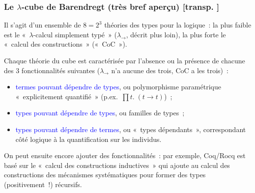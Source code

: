 \documentclass[mathserif,a4paper,aspectratio=169]{beamer}
\renewcommand{\frametitle}[1]{\subsubsection*{#1 {\footnotesize[transp. \insertframenumber]}}}
\begin{document}
\begin{frame}
\frametitle{Le $\lambda$-cube de Barendregt (très bref aperçu)}

Il s'agit d'un ensemble de $8 = 2^3$ théories des types pour la
logique : la plus faible est le « $\lambda$-calcul simplement typé »
($\lambda_\rightarrow$, décrit plus loin), la plus forte le « calcul
des constructions » (« CoC »).

\medskip

Chaque théorie du cube est caractérisée par l'absence ou la présence
de chacune des $3$ fonctionnalités suivantes ($\lambda_\rightarrow$
n'a aucune des trois, CoC a les trois) :

\begin{itemize}
\item \textcolor{blue}{termes pouvant dépendre de types}, ou
  polymorphisme paramétrique « explicitement quantifié » (p.ex. $\prod
  t.\; (t \rightarrow t)$) ;
\item \textcolor{blue}{types pouvant dépendre de types}, ou
  familles de types ;
\item \textcolor{blue}{types pouvant dépendre de termes}, ou « types
  dépendants », correspondant côté logique à la quantification sur les
  individus.
\end{itemize}

\medskip

{\footnotesize On peut ensuite encore ajouter des fonctionnalités :
  par exemple, Coq/Rocq est basé sur le « calcul des constructions
  inductives » qui ajoute au calcul des constructions des mécanismes
  systématiques pour former des types (positivement !) récursifs.\par}

\end{frame}
%
\end{document}
